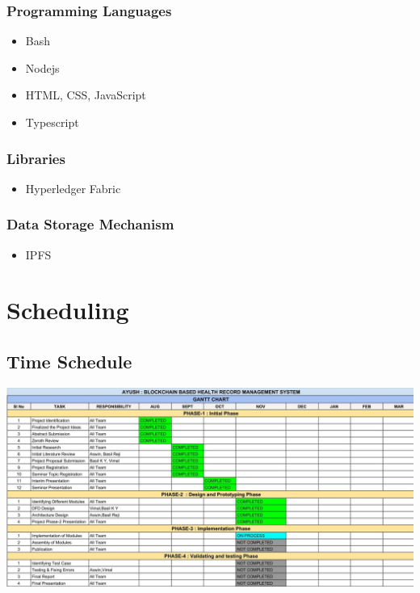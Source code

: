 \documentclass[11pt]{report}
\begin{document}
                \subsection{Programming Languages}
                            \begin{itemize}
                                \item Bash
                                \item Nodejs
                                \item HTML, CSS, JavaScript
                                \item Typescript
                            \end{itemize}
                 \subsection{Libraries}       
                                \begin{itemize}
                                    \item Hyperledger Fabric
                                \end{itemize}
                \subsection{Data Storage Mechanism}     
                                \begin{itemize}
                                    \item IPFS
                                \end{itemize}
                    
\chapter{Scheduling}
\section{Time Schedule}
\includegraphics[width=15cm]{Chart.jpeg}\newline
\end{document}
